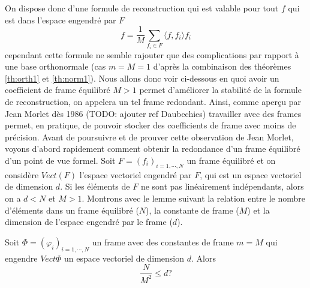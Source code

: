 \newline
On dispose donc d'une formule de reconstruction qui est valable pour tout $f$ qui est dans l'espace engendré par $F$ 
\begin{equation}
	f = \frac{1}{M} \sum_{f_i \in F} \langle f, f_i \rangle f_i 
\end{equation}
cependant cette formule ne semble rajouter que des complications par rapport à une base orthonormale (cas $m=M=1$ d'après la combinaison des théorèmes \ref{th:orth1} et \ref{th:norm1}). 
Nous allons donc voir ci-dessous en quoi avoir un coefficient de frame équilibré $M>1$ permet d'améliorer la stabilité de la formule de reconstruction, on appelera un tel frame redondant.
Ainsi, comme aperçu par Jean Morlet dès 1986 (TODO: ajouter ref Daubechies) travailler avec des frames permet, en pratique, de pouvoir stocker des coefficients de frame avec moins de précision.
Avant de poursuivre et de prouver cette observation de Jean Morlet, voyons d'abord rapidement comment obtenir la redondance d'un frame équilibré d'un point de vue formel.
Soit $F=(f_i)_{i=1, \cdots, N}$ un frame équilibré et on considère $Vect(F)$ l'espace vectoriel engendré par $F$, qui est un espace vectoriel de dimension $d$. 
Si les éléments de $F$ ne sont pas linéairement indépendants, alors on a $d<N$ et $M>1$.
Montrons avec le lemme suivant la relation entre le nombre d'éléments dans un frame équilibré ($N$), la constante de frame ($M$) et la dimension de l'espace engendré par le frame ($d$).
\begin{lemme}
	Soit $\Phi =(\varphi_i)_{i=1, \cdots, N}$ un frame avec des constantes de frame $m=M$ qui engendre $Vect \Phi$ un espace vectoriel de dimension $d$.
	Alors
	\begin{equation}
		\frac{N}{M^2} \leq d?
	\end{equation}
\end{lemme}
